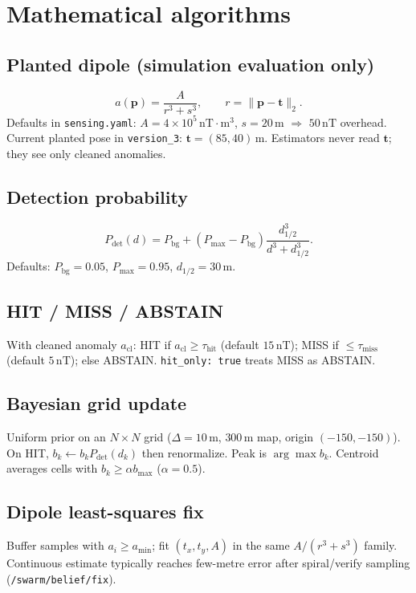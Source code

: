 \chapter{Mathematical algorithms}
\label{ch:algorithms}

\section{Planted dipole (simulation evaluation only)}
\[
  a(\mathbf{p})=\frac{A}{r^{3}+s^{3}},
  \qquad r=\lVert\mathbf{p}-\mathbf{t}\rVert_{2}.
\]
Defaults in \texttt{sensing.yaml}: \(A=4\times10^{5}\,\mathrm{nT\cdot m^{3}}\),
\(s=20\,\mathrm{m}\) $\Rightarrow$ \(50\,\mathrm{nT}\) overhead. Current planted
pose in \texttt{version\_3}: \(\mathbf{t}=(85,40)\,\mathrm{m}\). Estimators
never read \(\mathbf{t}\); they see only cleaned anomalies.

\section{Detection probability}
\[
  P_{\mathrm{det}}(d)=P_{\mathrm{bg}}+(P_{\max}-P_{\mathrm{bg}})
  \frac{d_{1/2}^{3}}{d^{3}+d_{1/2}^{3}}.
\]
Defaults: \(P_{\mathrm{bg}}=0.05\), \(P_{\max}=0.95\), \(d_{1/2}=30\,\mathrm{m}\).

\section{HIT / MISS / ABSTAIN}
With cleaned anomaly \(a_{\mathrm{cl}}\): HIT if
\(a_{\mathrm{cl}}\ge\tau_{\mathrm{hit}}\) (default \(15\,\mathrm{nT}\)); MISS if
\(\le\tau_{\mathrm{miss}}\) (default \(5\,\mathrm{nT}\)); else ABSTAIN.
\texttt{hit\_only: true} treats MISS as ABSTAIN.

\section{Bayesian grid update}
Uniform prior on an \(N\times N\) grid (\(\Delta=10\,\mathrm{m}\),
\(300\,\mathrm{m}\) map, origin \((-150,-150)\)). On HIT,
\(b_k\leftarrow b_k P_{\mathrm{det}}(d_k)\) then renormalize. Peak is
\(\arg\max b_k\). Centroid averages cells with
\(b_k\ge\alpha b_{\max}\) (\(\alpha=0.5\)).

\section{Dipole least-squares fix}
Buffer samples with \(a_i\ge a_{\min}\); fit \((t_x,t_y,A)\) in the same
\(A/(r^{3}+s^{3})\) family. Continuous estimate typically reaches few-metre
error after spiral/verify sampling (\texttt{/swarm/belief/fix}).

